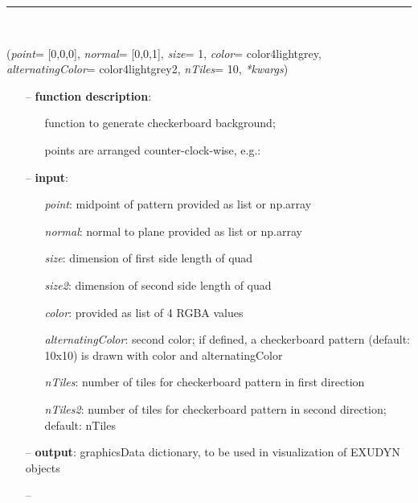 \begin{itemize}[leftmargin=1.4cm]
\begin{itemize}[leftmargin=1.4cm]
\begin{itemize}[leftmargin=0.5cm]
\begin{itemize}[leftmargin=1.4cm]
\begin{itemize}[leftmargin=1.4cm]
\begin{itemize}[leftmargin=0.5cm]
\begin{itemize}[leftmargin=1.4cm]
\begin{itemize}[leftmargin=0.5cm]
%
\noindent\rule{8cm}{0.75pt}\vspace{1pt} \\ 
\begin{flushleft}
\label{sec:graphicsDataUtilities:GraphicsDataCheckerBoard}
({\it point}= [0,0,0], {\it normal}= [0,0,1], {\it size}= 1, {\it color}= color4lightgrey, {\it alternatingColor}= color4lightgrey2, {\it nTiles}= 10, {\it **kwargs})
\end{flushleft}
\setlength{\itemindent}{0.7cm}
\begin{itemize}[leftmargin=0.7cm]
\item[--]
{\bf function description}: \vspace{-6pt}
\begin{itemize}[leftmargin=1.2cm]
\setlength{\itemindent}{-0.7cm}
\item[]function to generate checkerboard background;
\item[]points are arranged counter-clock-wise, e.g.:
\end{itemize}
\item[--]
{\bf input}: \vspace{-6pt}
\begin{itemize}[leftmargin=1.2cm]
\setlength{\itemindent}{-0.7cm}
\item[]{\it point}: midpoint of pattern provided as list or np.array
\item[]{\it normal}: normal to plane provided as list or np.array
\item[]{\it size}: dimension of first side length of quad
\item[]{\it size2}: dimension of second side length of quad
\item[]{\it color}: provided as list of 4 RGBA values
\item[]{\it alternatingColor}: second color; if defined, a checkerboard pattern (default: 10x10) is drawn with color and alternatingColor
\item[]{\it nTiles}: number of tiles for checkerboard pattern in first direction
\item[]{\it nTiles2}: number of tiles for checkerboard pattern in second direction; default: nTiles
\end{itemize}
\item[--]
{\bf output}: graphicsData dictionary, to be used in visualization of EXUDYN objects
\item[--]

\end{itemize}
\end{itemize}
\end{itemize}
\end{itemize}
\end{itemize}
\end{itemize}
\end{itemize}
\end{itemize}
\end{itemize}
